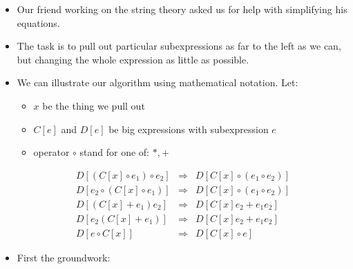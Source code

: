 \documentclass{beamer}
\begin{document}
\begin{itemize}
  \item Our friend working on the string theory asked us for help with
  simplifying his equations.
  
  \item The task is to pull out particular subexpressions as far to the left
  as we can, but changing the whole expression as little as possible.
  
  \item We can illustrate our algorithm using mathematical notation. Let:
  \begin{itemize}
    \item  $x$ be the thing we pull out
    
    \item $C [e]$ and $D [e]$ be big expressions with subexpression $e$
    
    \item operator $\circ$ stand for one of: $\ast, +$
  \end{itemize}
  \begin{eqnarray*}
    D [(C [x] \circ e_1) \circ e_2] & \Rightarrow & D [C [x] \circ (e_1 \circ
    e_2)]\\
    D [e_2 \circ (C [x] \circ e_1)] & \Rightarrow & D [C [x] \circ (e_1 \circ
    e_2)]\\
    D [(C [x] + e_1) e_2] & \Rightarrow & D [C [x] e_2 + e_1 e_2]\\
    D [e_2  (C [x] + e_1)] & \Rightarrow & D [C [x] e_2 + e_1 e_2]\\
    D [e \circ C [x]] & \Rightarrow & D [C [x] \circ e]
  \end{eqnarray*}
  \item First the groundwork:
\end{itemize}
{}{}{\hlopt{= }}{}{\hlopt{\textbar
}}{}{\hlendline{}}\\
{}{}{\hlopt{= }}{}{}{}{\hlopt{\textbar }}{}{}{}{\hlopt{\textbar }}{}{}{}{\hlopt{*}}{}{\hlopt{*}}{}\\
{}{}{\hlopt{=
}}{}{\hlopt{\textbar
}}{}{\hlendline{}}\\
{}{}{\hlopt{= (}}{}{\hlopt{* }}{}{\hlopt{* }}{}{\hlopt{)
}}{}{\hlendline{}}\\
\end{document}
